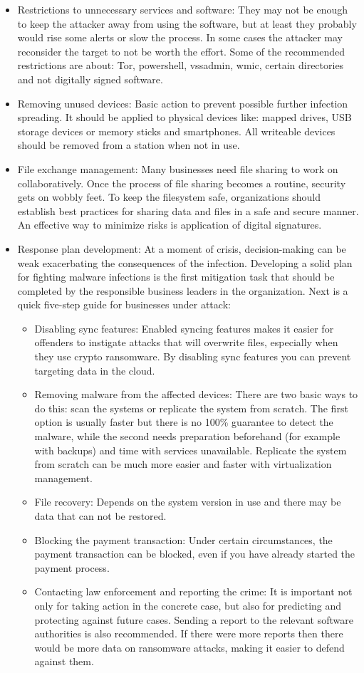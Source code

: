 \begin{itemize}
	\item Restrictions to unnecessary services and software:
They may not be enough to keep the attacker away from using the software, but at least they probably would rise some alerts or slow the process.
In some cases the attacker may reconsider the target to not be worth the effort.
Some of the recommended restrictions are about: Tor, powershell, vssadmin, wmic, certain directories and not digitally signed software.
	\item Removing unused devices:
Basic action to prevent possible further infection spreading.
It should be applied to physical devices like: mapped drives, USB storage devices or memory sticks and smartphones.
All writeable devices should be removed from a station when not in use.
	\item File exchange management:
Many businesses need file sharing to work on collaboratively.
Once the process of file sharing becomes a routine, security gets on wobbly feet.
To keep the filesystem safe, organizations should establish best practices for sharing data and files in a safe and secure manner.
An effective way to minimize risks is application of digital signatures.
	\item Response plan development:
At a moment of crisis, decision-making can be weak exacerbating the consequences of the infection.
Developing a solid plan for fighting malware infections is the first mitigation task that should be completed by the responsible business leaders in the organization.
\linej
Next is a quick five-step guide for businesses under attack:
	\begin{itemize}
		\item Disabling sync features:
Enabled syncing features makes it easier for offenders to instigate attacks that will overwrite files, especially when they use crypto ransomware.
By disabling sync features you can prevent targeting data in the cloud.
		\item Removing malware from the affected devices:
There are two basic ways to do this: scan the systems or replicate the system from scratch.
The first option is usually faster but there is no 100\% guarantee to detect the malware, while the second needs preparation beforehand (for example with backups) and time with services unavailable.
Replicate the system from scratch can be much more easier and faster with virtualization management.
		\item File recovery:
Depends on the system version in use and there may be data that can not be restored.
		\item Blocking the payment transaction:
Under certain circumstances, the payment transaction can be blocked, even if you have already started the payment process.
		\item Contacting law enforcement and reporting the crime:
It is important not only for taking action in the concrete case, but also for predicting and protecting against future cases.
Sending a report to the relevant software authorities is also recommended.
If there were more reports then there would be more data on ransomware attacks, making it easier to defend against them.
	\end{itemize}
\end{itemize}


